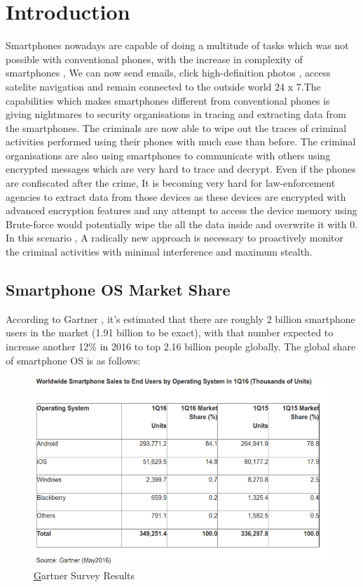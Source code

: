 %
%

\let\textcircled=\pgftextcircled
\chapter{Introduction}
\label{chap:intro}

Smartphones nowadays are capable of doing a multitude of tasks which was not possible with conventional phones, with the increase in complexity of smartphones , We can now send emails, click high-definition photos , access satelite navigation and remain connected to the outside world 24 x 7.The capabilities which makes smartphones different from conventional phones is giving nightmares to security organisations in tracing and extracting data from the smartphones. The criminals are now  able to wipe out the traces of criminal activities performed using their phones with much ease than before. The criminal organisations are also using smartphones to communicate with others using encrypted messages which are very hard to trace and decrypt. Even if the phones are confiscated after the crime, It is becoming very hard for law-enforcement agencies to extract data from those devices as these devices are encrypted with advanced encryption features and any attempt to access the device memory using Brute-force would potentially wipe the all the data inside and overwrite it with 0. In this scenario , A radically new approach is necessary to proactively 
monitor the criminal activities with minimal interference and maximum stealth.
\section{Smartphone OS Market Share}
\label{sec:sec01}
According to Gartner , it's estimated that there are roughly 2 billion smartphone users in the market (1.91 billion to be exact), with that number expected to increase another 12\% in 2016 to top 2.16 billion people globally. The global share of smartphone OS is as follows:
\begin{figure}
   \vspace*{-1cm}
    \includegraphics[height=0.5\textheight]{fig01/gartner}
    \caption{\href{http://www.gartner.com/newsroom/id/3323017} Gartner Survey Results}
    \label{gartner}
    
  \end{figure}


